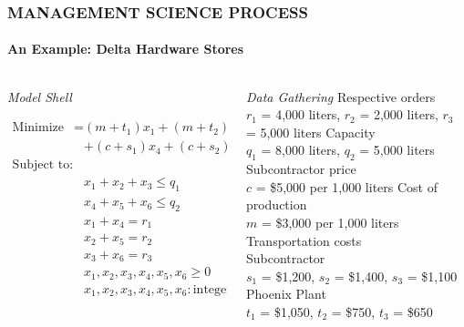 \documentclass[14 pt]{beamer}
\begin{document}
\begin{frame}[t]
\frametitle{MANAGEMENT SCIENCE PROCESS}
\framesubtitle{An Example: Delta Hardware Stores}

\begin{columns}[t]
\begin{column}{0.45\textwidth}
\emph{Model Shell}

\begin{equation*}
\begin{array}{lll}
  \text{Minimize Z}  = & (m + t_1) x_1 + (m+t_2) x_2 + (m+t_3) x_3 \\
                       & + (c + s_1) x_4 + (c + s_2) x_5 + (c + s_3) x_6 \\
  \text{Subject to:}\\
                       & x_1 + x_2 + x_3 \leq q_1 \\
                       & x_4 + x_5 + x_6 \leq q_2 \\
                       & x_1 + x_4  = r_1 \\
                       & x_2 + x_5  = r_2 \\
                       & x_3 + x_6  = r_3 \\
                       & x_1, x_2, x_3, x_4, x_5, x_6 \geq 0 \\
                       & x_1, x_2, x_3, x_4, x_5, x_6 : \text{integer}
\end{array}
\end{equation*}
\end{column}

\begin{column}{0.45\textwidth}
\emph{Data Gathering}
\vskip0.5cm%
Respective orders \\
$r_1$ = 4,000 liters, $r_2$ = 2,000 liters, $r_3$ = 5,000 liters
\vskip0.5cm%
Capacity \\
$q_1$ = 8,000 liters, $q_2$ = 5,000 liters
\vskip0.5cm%
Subcontractor price \\
$c$ = \$5,000 per 1,000 liters
\vskip0.5cm%
Cost of production \\
$m$ = \$3,000 per 1,000 liters 
\vskip0.5cm%
Transportation costs \\
Subcontractor \\
$s_1$ = \$1,200, $s_2$ = \$1,400, $s_3$ = \$1,100 \\
Phoenix Plant \\
$t_1$ = \$1,050, $t_2$ = \$750, $t_3$ = \$650
\end{column}
\end{columns}
\end{frame}
\end{document}
